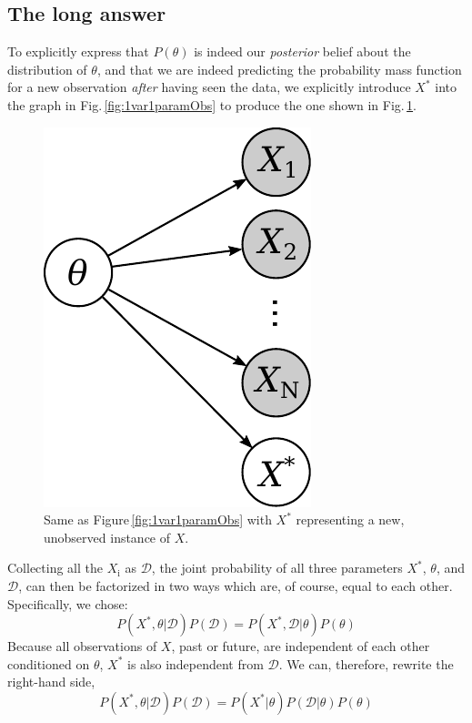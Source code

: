 \documentclass[]{report}
\begin{document}
\subsection{The long answer}
To explicitly express that $P(\theta)$ is indeed our \emph{posterior} belief about the distribution of $\theta$, and that we are indeed predicting the probability mass function for a new observation \emph{after} having seen the data, we explicitly introduce $X^*$ into the graph in Fig.\,\ref{fig:1var1paramObs} to produce the one shown in Fig.\,\ref{fig:1var1paramNewObs}.
\begin{figure}[h]
	\centering
	\includegraphics[scale=0.5]{1var_1param_new-obs}
	\caption{Same as Figure\,\ref{fig:1var1paramObs} with $X^*$ representing a new, unobserved instance of $X$.}
	\label{fig:1var1paramNewObs}
\end{figure}
Collecting all the $X_\mathrm{i}$ as $\mathcal{D}$, the joint probability of all three parameters $X^*$, $\theta$, and $\mathcal{D}$, can then be factorized in two ways which are, of course, equal to each other. Specifically, we chose:
\begin{equation}
P(X^*, \theta|\mathcal{D})P(\mathcal{D}) = P(X^*,\mathcal{D}|\theta)P(\theta)
\end{equation}
Because all observations of $X$, past or future, are independent of each other conditioned on $\theta$, $X^*$ is also independent from $\mathcal{D}$. We can, therefore, rewrite the right-hand side,
\begin{equation}
P(X^*, \theta|\mathcal{D})P(\mathcal{D}) = P(X^*|\theta)P(\mathcal{D}|\theta)P(\theta)
\end{equation}
\end{document}

